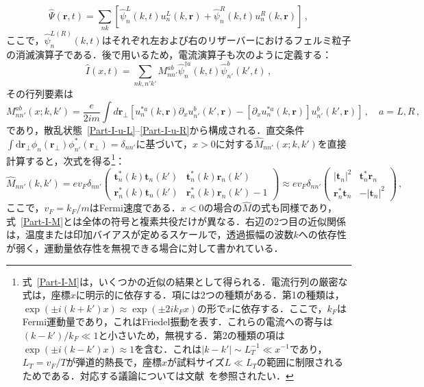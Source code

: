 \documentclass[a4paper,11pt]{ltjsarticle}
\def\d{\mathrm{d}}
\begin{document}
\begin{equation}
\hat{\Psi}(\mathbf{r},t)=\sum_{nk}\left[\hat{\psi}^{L}_{n}(k,t)u^{L}_{n}(k,\mathbf{r})+
\hat{\psi}^{R}_{n}(k,t)u^{R}_{n}(k,\mathbf{r})\right]\,,
\end{equation}
ここで，$\hat{\psi}^{L(R)}_{n}(k,t)$はそれぞれ左および右のリザーバーにおけるフェルミ粒子の消滅演算子である．後で用いるため，電流演算子も次のように定義する：
\begin{equation}\label{Part-I-Current}
\hat{I}(x,t)=\sum_{nk,n'k'}M^{ab}_{nn'}\hat{\psi}^{\dag
a}_{n}(k,t)\hat{\psi}^{b}_{n'}(k',t)\,,
\end{equation}
その行列要素は
\begin{equation}
M^{ab}_{nn'}(x;k,k')=\frac{e}{2im}\int
d\mathbf{r}_{\perp}\left[u^{*a}_{n}(k,\mathbf{r})\partial_{x}u^{b}_{n'}(k',\mathbf{r})-
[\partial_{x} u^{*a}_{n}(k,\mathbf{r})]u^{b}_{n'}(k',\mathbf{r})\right]\,
, \quad a=L,R\,,
\end{equation}
であり，散乱状態~\eqref{Part-I-u-L}--\eqref{Part-I-u-R}から構成される．直交条件$\int
\d\mathbf{r}_{\perp}\phi^{\phantom{*}}_{n}(\mathbf{r}_{\perp})
\phi^{*}_{n'}(\mathbf{r}_{\perp})=\delta_{nn'}$に基づいて，$x>0$に対する$\hat{M}_{nn'}(x;k,k')$を直接計算すると，次式を得る\footnote{式~\eqref{Part-I-M}は，いくつかの近似の結果として得られる．電流行列の厳密な式は，座標$x$に明示的に依存する．項には2つの種類がある．第1の種類は，$\exp(\pm i(k+k')x)\approx\exp(\pm2ik_{F}x)$の形で$x$に依存する．ここで，$k_{F}$はFermi運動量であり，これはFriedel振動を表す．これらの電流への寄与は$(k-k')/k_{F}\ll 1$と小さいため，無視する．第2の種類の項は$\exp(\pm
i(k-k')x)\approx 1$を含む．これは$|k-k'|\sim L_T^{-1}\ll x^{-1}$であり，$L_{T}=v_{F}/T$が弾道的熱長で，座標$x$が試料サイズ$L\ll L_T$の範囲に制限されるためである．対応する議論については文献~\cite{Buttiker}を参照されたい．}：
\begin{equation}\label{Part-I-M}
\hat{M}_{nn'}(k,k')=ev_{F}\delta_{nn'} \left(\begin{array}{cl}
\mathbf{t}^{*}_{n}(k)\mathbf{t}_{n}(k') &
\mathbf{t}^{*}_{n}(k)\mathbf{r}_{n}(k') \\
\mathbf{r}^{*}_{n}(k)\mathbf{t}_{n}(k') &
\mathbf{r}^{*}_{n}(k)\mathbf{r}_{n}(k')-1
\end{array}\right)\approx ev_{F}\delta_{nn'}
\left(\begin{array}{lr}|\mathbf{t}_{n}|^{2} &
\mathbf{t}^{*}_{n}\mathbf{r}_{n}\\ \mathbf{r}^{*}_{n}\mathbf{t}_{n}
& -|\mathbf{t}_n|^{2}
\end{array}\right) \,,
\end{equation}
ここで，$v_{F}=k_{F}/m$はFermi速度である．$x<0$の場合の$\hat{M}$の式も同様であり，式~\eqref{Part-I-M}とは全体の符号と複素共役だけが異なる．右辺の2つ目の近似関係は，温度または印加バイアスが定めるスケールで，透過振幅の波数$k$への依存性が弱く，運動量依存性を無視できる場合に対して書かれている．
\end{document}
